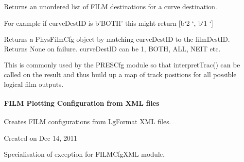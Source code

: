 \documentclass[letterpaper,10pt,english]{sphinxmanual}
\begin{document}
\begin{fulllineitems}
\begin{fulllineitems}
\end{fulllineitems}


\begin{fulllineitems}
\label{\detokenize{ref/util/plot/FILMCfg:TotalDepth.util.plot.FILMCfg.FilmCfgLISRead.retAllFILMDestS}}
Returns an unordered list of FILM destinations for a curve destination.

For example if curveDestID is b’BOTH’ this might return {[}b‘2   ‘, b‘1   ‘{]}

\end{fulllineitems}


\begin{fulllineitems}
\label{\detokenize{ref/util/plot/FILMCfg:TotalDepth.util.plot.FILMCfg.FilmCfgLISRead.retFILMDest}}
Returns a PhysFilmCfg object by matching curveDestID to the filmDestID.
Returns None on failure. curveDestID can be 1, BOTH, ALL, NEIT etc.

This is commonly used by the PRESCfg module so that interpretTrac() can
be called on the result and thus build up a map of track positions for
all possible logical film outputs.

\end{fulllineitems}


\end{fulllineitems}



\paragraph{FILM Plotting Configuration from XML files}
\label{\detokenize{ref/util/plot/FILMCfgXML:module-TotalDepth.util.plot.FILMCfgXML}}\label{\detokenize{ref/util/plot/FILMCfgXML::doc}}\label{\detokenize{ref/util/plot/FILMCfgXML:film-plotting-configuration-from-xml-files}}
Creates FILM configurations from LgFormat XML files.

Created on Dec 14, 2011

\begin{fulllineitems}
\label{\detokenize{ref/util/plot/FILMCfgXML:TotalDepth.util.plot.FILMCfgXML.ExceptionFILMCfgXML}}
Specialisation of exception for FILMCfgXML module.

\end{fulllineitems}
\end{document}
